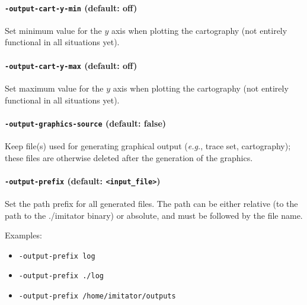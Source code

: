 \documentclass[a4paper,11pt]{report}
\newcommand{\binimitator}{./imitator}
\newcommand{\styleOption}[1]{\textcolor{optioncolor}{\texttt{#1}}}
\newcommand{\stylePath}[1]{\textcolor{pathcolor}{\texttt{#1}}}
\newcommand{\eg}{\textcolor{colorok}{\textit{e.g.}, }}
\begin{document}
\paragraph{\styleOption{-output-cart-y-min} (default: off)}
Set minimum value for the $y$ axis when plotting the cartography (not entirely functional in all situations yet).

\paragraph{\styleOption{-output-cart-y-max} (default: off)}
Set maximum value for the $y$ axis when plotting the cartography (not entirely functional in all situations yet).



\paragraph{\styleOption{-output-graphics-source} (default: false)}
Keep file(s) used for generating graphical output (\eg{} trace set, cartography); these files are otherwise deleted after the generation of the graphics.


\paragraph{\styleOption{-output-prefix} (default: \stylePath{<input\_file>})}
Set the path prefix for all generated files.
The path can be either relative (to the path to the \binimitator{} binary) or absolute, and must be followed by the file name.

Examples:
\begin{itemize}
	\item \styleOption{-output-prefix log}
	\item \styleOption{-output-prefix ./log}
	\item \styleOption{-output-prefix /home/imitator/outputs}
\end{itemize}


\end{document}
